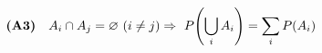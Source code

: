 \documentclass[preview]{standalone}
\begin{document}
\begin{align*}
\special{dvisvgm:raw <g id='unique000'>}\textbf{(A3)}\quad A_i\cap A_j=\varnothing\ (i\ne j)\Rightarrow\ P\!\left(\bigcup_i A_i\right)=\sum_i P(A_i)\special{dvisvgm:raw </g>}
\end{align*}
\end{document}
